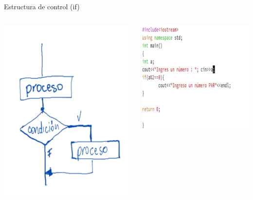 \documentclass[presentation, aspectratio=54]{beamer}
\begin{document}
\begin{frame}[label={sec:orgfb8e82e}]{Estructura de control (if)}
\begin{columns}
\begin{column}{0.4\columnwidth}
\begin{center}
\includegraphics[width=.9\linewidth]{./images/codigo/if.png}
\end{center}
\end{column}
\begin{column}{0.6\columnwidth}
\begin{center}
\includegraphics[width=.9\linewidth]{./images/codigo/code-if.png}

\end{center}
\end{column}
\end{columns}
\end{frame}
\end{document}
